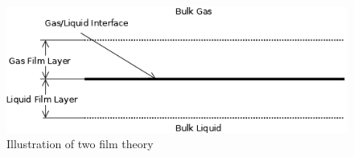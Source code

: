 
\begin{figure}[ht]
\includegraphics[width=\textwidth,height=\textheight,keepaspectratio]{GFX/twoFilm.png} 
\caption{Illustration of two film theory}
\label{twoFilm}
\end{figure}